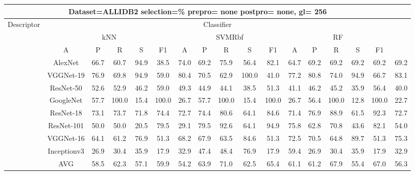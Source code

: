 \documentclass[12pt,italian]{article}
\begin{document}
\begin{tiny}
\begin{longtable}{lcccccccccccccccc}
\toprule
\multicolumn{16}{c}{Dataset=ALLIDB2 selection=\% prepro= none postpro= none, gl= 256} \\ 
\toprule
Descriptor & \multicolumn{15}{c}{Classifier} \\ 
& \multicolumn{5}{c}{kNN} & \multicolumn{5}{c}{SVMRbf} & \multicolumn{5}{c}{RF} \\ 
& A & P & R & S & F1 & A & P & R & S & F1 & A & P & R & S & F1 \\ 
\midrule
& AlexNet & 66.7 & 60.7 & 94.9 & 38.5 & 74.0 & 69.2 & 75.9 & 56.4 & 82.1 & 64.7 & 69.2 & 69.2 & 69.2 & 69.2 & 69.2 \\ 
& VGGNet-19 & 76.9 & 69.8 & 94.9 & 59.0 & 80.4 & 70.5 & 62.9 & 100.0 & 41.0 & 77.2 & 80.8 & 74.0 & 94.9 & 66.7 & 83.1 \\ 
& ResNet-50 & 52.6 & 52.9 & 46.2 & 59.0 & 49.3 & 44.9 & 44.1 & 38.5 & 51.3 & 41.1 & 46.2 & 45.2 & 35.9 & 56.4 & 40.0 \\ 
& GoogleNet & 57.7 & 100.0 & 15.4 & 100.0 & 26.7 & 57.7 & 100.0 & 15.4 & 100.0 & 26.7 & 56.4 & 100.0 & 12.8 & 100.0 & 22.7 \\ 
& ResNet-18 & 73.1 & 73.7 & 71.8 & 74.4 & 72.7 & 74.4 & 80.6 & 64.1 & 84.6 & 71.4 & 76.9 & 88.9 & 61.5 & 92.3 & 72.7 \\ 
& ResNet-101 & 50.0 & 50.0 & 20.5 & 79.5 & 29.1 & 79.5 & 92.6 & 64.1 & 94.9 & 75.8 & 62.8 & 70.8 & 43.6 & 82.1 & 54.0 \\ 
& VGGNet-16 & 64.1 & 61.2 & 76.9 & 51.3 & 68.2 & 67.9 & 63.5 & 84.6 & 51.3 & 72.5 & 70.5 & 64.8 & 89.7 & 51.3 & 75.3 \\ 
& Inceptionv3 & 26.9 & 30.4 & 35.9 & 17.9 & 32.9 & 47.4 & 48.4 & 76.9 & 17.9 & 59.4 & 26.9 & 30.4 & 35.9 & 17.9 & 32.9 \\ 
\hline
& AVG & 58.5 & 62.3 & 57.1 & 59.9 & 54.2 & 63.9 & 71.0 & 62.5 & 65.4 & 61.1 & 61.2 & 67.9 & 55.4 & 67.0 & 56.3 \\ 
\hline
\bottomrule
\end{longtable} 

 \pagebreak 
\end{tiny} 
 
\end{document}

